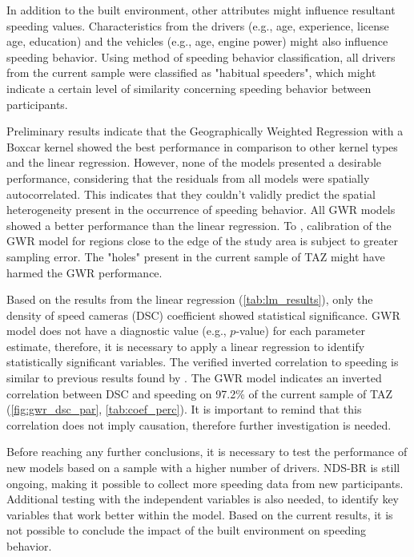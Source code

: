 In addition to the built environment, other attributes might influence resultant speeding values. Characteristics from the drivers (e.g., age, experience, license age, education) and the vehicles (e.g., age, engine power) might also influence speeding behavior. Using \textcite{Richard2013a} method of speeding behavior classification, all drivers from the current sample were classified as "habitual speeders", which might indicate a certain level of similarity concerning speeding behavior between participants.

Preliminary results indicate that the Geographically Weighted Regression with a Boxcar kernel showed the best performance in comparison to other kernel types and the linear regression. However, none of the models presented a desirable performance, considering that the residuals from all models were spatially autocorrelated. This indicates that they couldn't validly predict the spatial heterogeneity present in the occurrence of speeding behavior. All GWR models showed a better performance than the linear regression. To \textcite{Brunsdon2010}, calibration of the GWR model for regions close to the edge of the study area is subject to greater sampling error. The "holes" present in the current sample of TAZ might have harmed the GWR performance. 

Based on the results from the linear regression (\autoref{tab:lm_results}), only the density of speed cameras (DSC) coefficient showed statistical significance. GWR model does not have a diagnostic value (e.g., $p$-value) for each parameter estimate, therefore, it is necessary to apply a linear regression to identify statistically significant variables. The verified inverted correlation to speeding is similar to previous results found by \textcite{Li2020,Li2013a,Oliveira2015}. The GWR model indicates an inverted correlation between DSC and speeding on 97.2\% of the current sample of TAZ (\autoref{fig:gwr_dsc_par}, \autoref{tab:coef_perc}). It is important to remind that this correlation does not imply causation, therefore further investigation is needed. 

Before reaching any further conclusions, it is necessary to test the performance of new models based on a sample with a higher number of drivers. NDS-BR is still ongoing, making it possible to collect more speeding data from new participants. Additional testing with the independent variables is also needed, to identify key variables that work better within the model. Based on the current results, it is not possible to conclude the impact of the built environment on speeding behavior.

